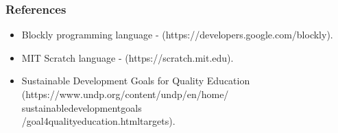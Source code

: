 \documentclass{beamer}
\begin{document}
\begin{frame}
\frametitle{References}
\begin{center}
\justifying
\begin{itemize}
\item Blockly programming language - (https://developers.google.com/blockly).
\item MIT Scratch language - (https://scratch.mit.edu).
\item Sustainable Development Goals for Quality Education 
(https://www.undp.org/content/undp/en/home/
\\ sustainabledevelopmentgoals
\\ /goal4qualityeducation.htmltargets).
\end{itemize}
\end{center}
\end{frame} 
\end{document}
